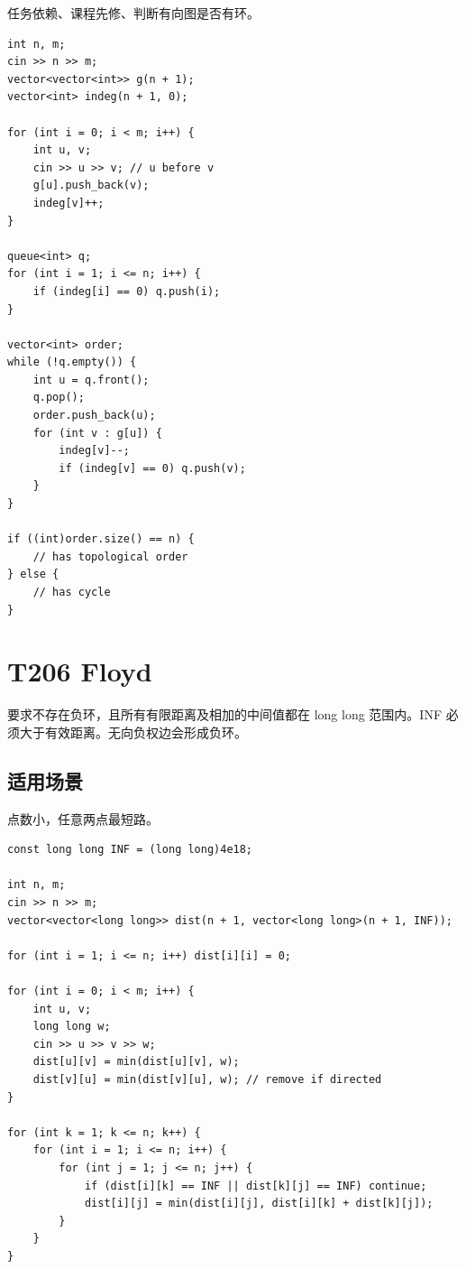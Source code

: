 任务依赖、课程先修、判断有向图是否有环。

\begin{lstlisting}
int n, m;
cin >> n >> m;
vector<vector<int>> g(n + 1);
vector<int> indeg(n + 1, 0);

for (int i = 0; i < m; i++) {
    int u, v;
    cin >> u >> v; // u before v
    g[u].push_back(v);
    indeg[v]++;
}

queue<int> q;
for (int i = 1; i <= n; i++) {
    if (indeg[i] == 0) q.push(i);
}

vector<int> order;
while (!q.empty()) {
    int u = q.front();
    q.pop();
    order.push_back(u);
    for (int v : g[u]) {
        indeg[v]--;
        if (indeg[v] == 0) q.push(v);
    }
}

if ((int)order.size() == n) {
    // has topological order
} else {
    // has cycle
}
\end{lstlisting}

\section{T206 Floyd}\label{sec:09-20}\label{tpl:206}

要求不存在负环，且所有有限距离及相加的中间值都在 long long 范围内。INF 必须大于有效距离。无向负权边会形成负环。

\subsection{适用场景}

点数小，任意两点最短路。

\begin{lstlisting}
const long long INF = (long long)4e18;

int n, m;
cin >> n >> m;
vector<vector<long long>> dist(n + 1, vector<long long>(n + 1, INF));

for (int i = 1; i <= n; i++) dist[i][i] = 0;

for (int i = 0; i < m; i++) {
    int u, v;
    long long w;
    cin >> u >> v >> w;
    dist[u][v] = min(dist[u][v], w);
    dist[v][u] = min(dist[v][u], w); // remove if directed
}

for (int k = 1; k <= n; k++) {
    for (int i = 1; i <= n; i++) {
        for (int j = 1; j <= n; j++) {
            if (dist[i][k] == INF || dist[k][j] == INF) continue;
            dist[i][j] = min(dist[i][j], dist[i][k] + dist[k][j]);
        }
    }
}
\end{lstlisting}


